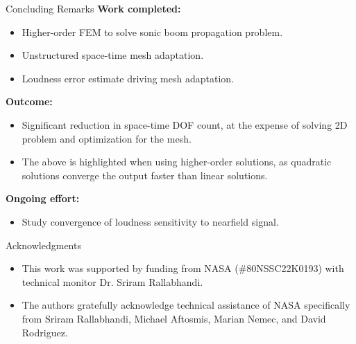 \documentclass{beamer}
\begin{document}

{

\begin{frame}[t]{Concluding Remarks}
  \textbf{Work completed:}
  \begin{itemize}
    \item Higher-order FEM to solve sonic boom propagation problem.
    \item Unstructured space-time mesh adaptation.
    \item Loudness error estimate driving mesh adaptation.
  \end{itemize}

  {
  \textbf{Outcome:}
  \begin{itemize}
      \item Significant reduction in space-time DOF count, at the expense of solving 2D problem and optimization for the mesh.
      \item The above is highlighted when using higher-order solutions, as quadratic solutions converge the output faster than linear solutions.
    \end{itemize}
  }

  {
    \vspace{15pt}
    \textbf{Ongoing effort:}
    \begin{itemize}
      \item Study convergence of loudness sensitivity to nearfield signal.
    \end{itemize}
  }
\end{frame}


\begin{frame}[t]{Acknowledgments}

  \begin{itemize}
    \item This work was supported by funding from NASA (\#80NSSC22K0193) with technical monitor Dr. Sriram Rallabhandi.
    \item The authors gratefully acknowledge technical assistance of NASA specifically from Sriram Rallabhandi, Michael Aftosmis, Marian Nemec, and David Rodriguez.
  \end{itemize}

\end{frame}

}
\end{document}
